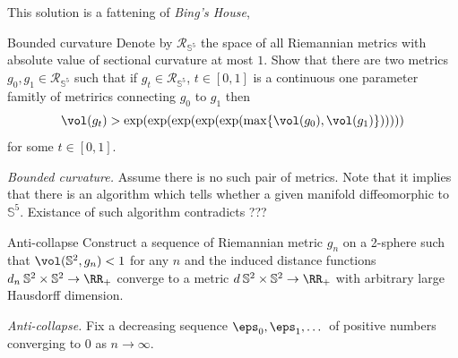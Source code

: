 This solution is a fattening of \emph{Bing's House}, 


















\begin{pr}{}{Bounded curvature}\label{Bounded curvature}
Denote by $\mathcal{R}_{\mathbb S^5}$ the space of all Riemannian metrics with absolute value of sectional curvature at most $1$.
Show that there are two metrics $g_0,g_1\in \mathcal{R}_{\mathbb S^5}$ such that if $g_t\in\mathcal{R}_{\mathbb S^5}$,
$t\in [0,1]$ is a continuous one parameter famitly of metrirics connecting $g_0$ to $g_1$ then
\[\vol(g_t)>\exp(\exp(\exp(\exp(\exp(\max\{\vol(g_0),\vol(g_1)\})))))\]
for some $t\in [0,1]$.
\end{pr}

\textit{Bounded curvature.}
Assume there is no such pair of metrics.
Note that it implies that there is an algorithm which 
tells whether a given manifold diffeomorphic to $\mathbb{S}^5$.
Existance of such algorithm contradicts ???



























\begin{pr}{}{Anti-collapse}\label{anti-collaps} Construct
a sequence of Riemannian metric $g_n$ on a 2-sphere such that 
$\vol (\mathbb S^2,g_n)<1$ for any $n$ 
and the induced distance functions $d_n\:\mathbb{S}^2\times \mathbb{S}^2\to \RR_+$
converge to a metric $d\:\mathbb{S}^2\times \mathbb{S}^2\to \RR_+$ 
with arbitrary large Hausdorff dimension.
\end{pr}

\textit{Anti-collapse.}
Fix a decreasing sequence $\eps_0,\eps_1,\dots$ of positive numbers converging to $0$ as $n\to \infty$.

